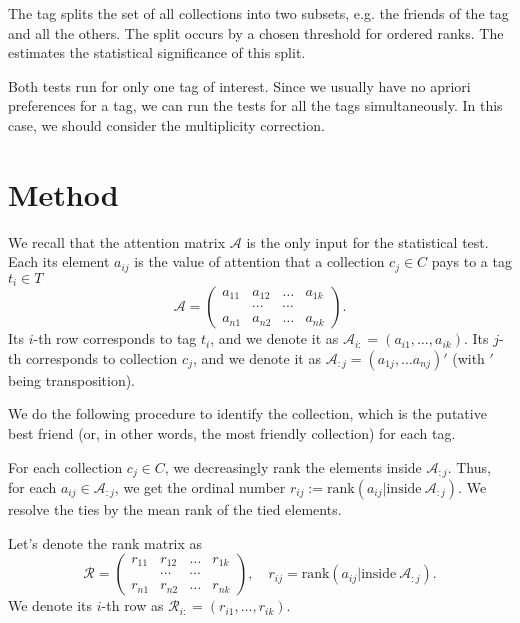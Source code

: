 \documentclass{llncs}
\begin{document}
The tag splits the set of all collections into two subsets, e.g. the friends of the tag and all the others. The split occurs by a chosen threshold for ordered ranks. The  estimates the statistical significance of this split.

Both tests run for only one tag of interest. Since we usually have no apriori preferences for a tag, we can run the tests for all the tags simultaneously. In this case, we should consider the multiplicity correction. 

\section{Method}
\label{sec:method}


We recall that the attention matrix $\mathcal{A}$ is the only input for the statistical test. Each its element $a_{ij}$ is the value of attention that a collection $c_j \in C$ pays to a tag $t_i \in T$
\[
\mathcal{A} = \begin{pmatrix}
a_{11} & a_{12} & \dots & a_{1k} \\
       &\cdots & \cdots &  \\
a_{n1} & a_{n2} & \dots & a_{nk}
\end{pmatrix}.
\]
Its $i$-th row corresponds to tag $t_i$, and we denote it as $\mathcal{A}_{i:} = (a_{i1}, \dots, a_{ik})$. Its $j$-th  corresponds to collection $c_j$, and we denote it as $\mathcal{A}_{:j} =(a_{1j}, \dots a_{nj})'$ (with $'$ being transposition).


We do the following procedure to identify the collection, which is the putative best friend (or, in other words, the most friendly collection) for each tag.

For each collection $c_j \in C$, we decreasingly rank the elements inside $\mathcal{A}_{:j}$. Thus, for each $a_{ij} \in \mathcal{A}_{:j}$, we get the ordinal number $r_{ij}:=\text{rank}\left(a_{ij}|\text{inside}~\mathcal{A}_{:j}\right)$. We resolve the ties by the mean rank of the tied elements. 

Let's denote the rank matrix as 
\begin{equation}
\label{def:R}
\mathcal{R} = \begin{pmatrix}
r_{11} & r_{12} & \dots & r_{1k} \\
       &\cdots & \cdots &  \\
r_{n1} & r_{n2} & \dots & r_{nk}
\end{pmatrix}, 
\quad
r_{ij} =\text{rank}\left(a_{ij}|\text{inside}~\mathcal{A}_{:j}\right).
\end{equation}
We denote its $i$-th row as $\mathcal{R}_{i:} = (r_{i1}, \dots, r_{ik})$.
\end{document}

